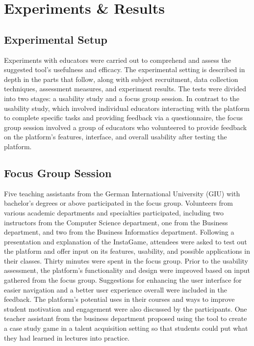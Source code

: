 \chapter{Experiments \& Results}\label{chap:results}

\section{Experimental Setup}

Experiments with educators were carried out to comprehend and assess the suggested tool's usefulness and efficacy. The experimental setting is described in depth in the parts that follow, along with subject recruitment, data collection techniques, assessment measures, and experiment results. The tests were divided into two stages: a usability study and a focus group session. In contrast to the usability study, which involved individual educators interacting with the platform to complete specific tasks and providing feedback via a questionnaire, the focus group session involved a group of educators who volunteered to provide feedback on the platform's features, interface, and overall usability after testing the platform.


\section{Focus Group Session}

Five teaching assistants from the German International University (GIU) with bachelor's degrees or above participated in the focus group. Volunteers from various academic departments and specialties participated, including two instructors from the Computer Science department, one from the Business department, and two from the Business Informatics department. Following a presentation and explanation of the InstaGame, attendees were asked to test out the platform and offer input on its features, usability, and possible applications in their classes. Thirty minutes were spent in the focus group. Prior to the usability assessment, the platform's functionality and design were improved based on input gathered from the focus group. Suggestions for enhancing the user interface for easier navigation and a better user experience overall were included in the feedback. The platform's potential uses in their courses and ways to improve student motivation and engagement were also discussed by the participants. One teacher assistant from the business department proposed using the tool to create a case study game in a talent acquisition setting so that students could put what they had learned in lectures into practice.

